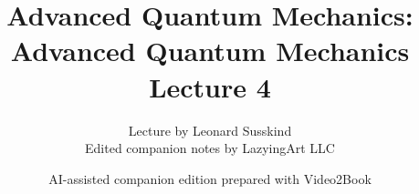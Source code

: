 \documentclass[11pt,oneside]{book}
\begin{document}
\frontmatter
\title{Advanced Quantum Mechanics: Advanced Quantum Mechanics Lecture 4}
\author{Lecture by Leonard Susskind\\Edited companion notes by LazyingArt LLC}
\date{AI-assisted companion edition prepared with Video2Book}
\maketitle
\clearpage
\mainmatter

\end{document}
